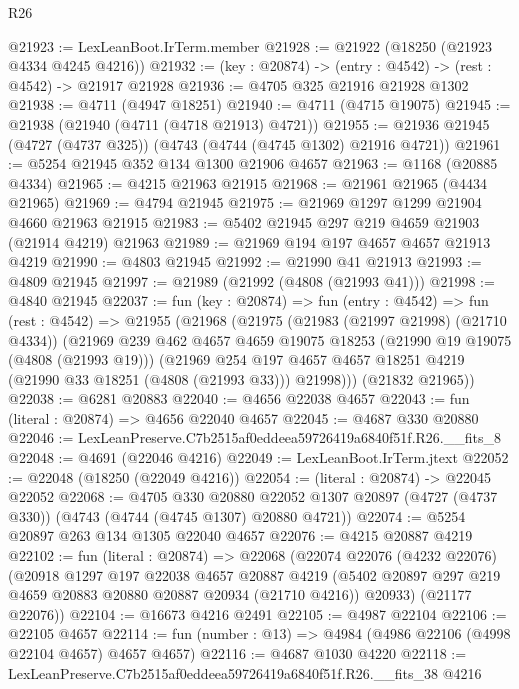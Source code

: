 \begin{lexlean}{R26}
\begin{coremodule}
@21923 := LexLeanBoot.IrTerm.member
@21928 := @21922 (@18250 (@21923 @4334 @4245 @4216))
@21932 := (key : @20874) -> (entry : @4542) -> (rest : @4542) -> @21917 @21928
@21936 := @4705 @325 @21916 @21928 @1302
@21938 := @4711 (@4947 @18251)
@21940 := @4711 (@4715 @19075)
@21945 := @21938 (@21940 (@4711 (@4718 @21913) @4721))
@21955 := @21936 @21945 (@4727 (@4737 @325)) (@4743 (@4744 (@4745 @1302) @21916 @4721))
@21961 := @5254 @21945 @352 @134 @1300 @21906 @4657
@21963 := @1168 (@20885 @4334)
@21965 := @4215 @21963 @21915
@21968 := @21961 @21965 (@4434 @21965)
@21969 := @4794 @21945
@21975 := @21969 @1297 @1299 @21904 @4660 @21963 @21915
@21983 := @5402 @21945 @297 @219 @4659 @21903 (@21914 @4219) @21963
@21989 := @21969 @194 @197 @4657 @4657 @21913 @4219
@21990 := @4803 @21945
@21992 := @21990 @41 @21913
@21993 := @4809 @21945
@21997 := @21989 (@21992 (@4808 (@21993 @41)))
@21998 := @4840 @21945
@22037 := fun (key : @20874) =>
  fun (entry : @4542) =>
  fun (rest : @4542) =>
  @21955
    (@21968
      (@21975
        (@21983 (@21997 @21998) (@21710 @4334))
        (@21969
          @239
          @462
          @4657
          @4659
          @19075
          @18253
          (@21990 @19 @19075 (@4808 (@21993 @19)))
          (@21969
            @254
            @197
            @4657
            @4657
            @18251
            @4219
            (@21990 @33 @18251 (@4808 (@21993 @33)))
            @21998)))
      (@21832 @21965))
@22038 := @6281 @20883
@22040 := @4656 @22038 @4657
@22043 := fun (literal : @20874) => @4656 @22040 @4657
@22045 := @4687 @330 @20880
@22046 := LexLeanPreserve.C7b2515af0eddeea59726419a6840f51f.R26.__fits_8
@22048 := @4691 (@22046 @4216)
@22049 := LexLeanBoot.IrTerm.jtext
@22052 := @22048 (@18250 (@22049 @4216))
@22054 := (literal : @20874) -> @22045 @22052
@22068 := @4705
    @330
    @20880
    @22052
    @1307
    @20897
    (@4727 (@4737 @330))
    (@4743 (@4744 (@4745 @1307) @20880 @4721))
@22074 := @5254 @20897 @263 @134 @1305 @22040 @4657
@22076 := @4215 @20887 @4219
@22102 := fun (literal : @20874) =>
  @22068
    (@22074
      @22076
      (@4232 @22076)
      (@20918
        @1297
        @197
        @22038
        @4657
        @20887
        @4219
        (@5402 @20897 @297 @219 @4659 @20883 @20880 @20887 @20934 (@21710 @4216))
        @20933)
      (@21177 @22076))
@22104 := @16673 @4216 @2491
@22105 := @4987 @22104
@22106 := @22105 @4657
@22114 := fun (number : @13) => @4984 (@4986 @22106 (@4998 @22104 @4657) @4657 @4657)
@22116 := @4687 @1030 @4220
@22118 := LexLeanPreserve.C7b2515af0eddeea59726419a6840f51f.R26.__fits_38 @4216

\end{coremodule}
\end{lexlean}
